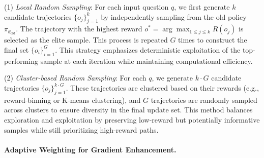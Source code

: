 (1) \textit{Local Random Sampling}: For each input question $q$, we first generate $k$ candidate trajectories $\{o_j\}_{j=1}^k$ by independently sampling from the old policy $\pi_{\theta_{\text{old}}}$. The trajectory with the highest reward $o^* = \arg\max_{1 \leq j \leq k} R(o_j)$ is selected as the elite sample. This process is repeated $G$ times to construct the final set $\{o_i\}_{i=1}^G$. This strategy emphasizes deterministic exploitation of the top-performing sample at each iteration while maintaining computational efficiency.  

(2) \textit{Cluster-based Random Sampling}: For each $q$, we generate $k \cdot G$ candidate trajectories $\{o_j\}_{j=1}^{k \cdot G}$. These trajectories are clustered based on their rewards (e.g., reward-binning or K-means clustering), and $G$ trajectories are randomly sampled across clusters to ensure diversity in the final update set. This method balances exploration and exploitation by preserving low-reward but potentially informative samples while still prioritizing high-reward paths.

\paragraph{Adaptive Weighting for Gradient Enhancement.}
\label{sec:Adaptive Weighting}
\label{Adaptive Weighting}



